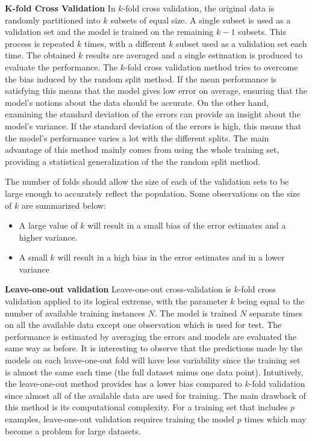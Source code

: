 \documentclass[conference,compsoc]{IEEEtran}
\begin{document}
\textbf{K-fold Cross Validation} In $k$-fold cross validation, the original data is randomly partitioned into $k$ subsets of equal size. A single subset is used as a validation set and the model is trained on the remaining $k-1$ subsets. This process is repeated $k$ times, with a different $k$ subset used as a validation set each time. The obtained $k$ results are averaged and a single estimation is produced to evaluate the performance. The $k$-fold cross validation method tries to overcome the bias induced by the random split method. If the mean performance is satisfying this means that the model gives low error on average, ensuring that the model's notions about the data should be accurate. On the other hand, examining the standard deviation of the errors can provide an insight about the model's variance. If the standard deviation of the errors is high, this means that the model's performance varies a lot with the different splits. The main advantage of this method mainly comes from using the whole training set, providing a statistical generalization of the the random split method.

The number of folds should allow the size of each of the validation sets to be large enough to accurately reflect the population. Some observations on the size of $k$ are summarized below:

\begin{itemize}

\item A large value of $k$ will result in a small bias of the error estimates and a higher variance.
\item A small $k$ will result in a high bias in the error estimates and in a lower variance


\end{itemize}


\textbf{Leave-one-out validation} Leave-one-out cross-validation is $k$-fold cross validation applied to its logical extreme, with the parameter $k$ being equal to the number of available training instances $N$. The model is trained $N$ separate times on all the available data except one observation which is used for test. The performance is estimated by averaging the errors and models are evaluated the same way as before. It is interesting to observe that the predictions made by the models on each leave-one-out fold will have less variability since the training set is almost the same each time (the full dataset minus one data point). Intuitively, the leave-one-out method provides has a lower bias compared to $k$-fold validation since almost all of the available data are used for training.  The main drawback of this method is its computational complexity. For a training set that includes $p$ examples, leave-one-out validation requires training the model $p$ times which may become a problem for large datasets.
\end{document}
